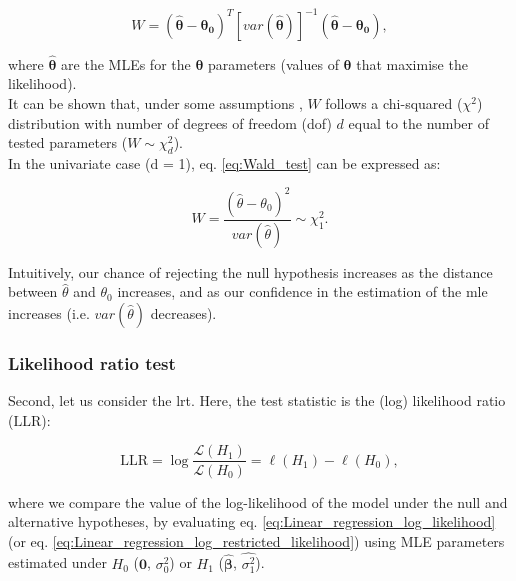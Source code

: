 \begin{equation}\label{eq:Wald_test}
W = (\hat{\boldsymbol{\theta}}-\boldsymbol{\theta_0})^T [var(\boldsymbol{\hat{\theta}})]^{-1}(\hat{\boldsymbol{\theta}}-\boldsymbol{\theta_0}), 
\end{equation}

where $\hat{\boldsymbol{\theta}}$ are the MLEs for the $\boldsymbol{\theta}$ parameters (values of $\boldsymbol{\theta}$ that maximise the likelihood).\\

It can be shown that, under some assumptions \cite{wald1943tests}, $W$ follows a chi-squared ($\chi^2$) distribution with number of degrees of freedom (dof) $d$ equal to the number of tested parameters ($W \sim \chi^2_d $).\\

In the univariate case (d = 1), eq. \eqref{eq:Wald_test} can be expressed as:

\begin{equation}\label{eq:Wald_test_univariate}
    W = \frac{(\hat{\theta}-\theta_0)^2}{var(\hat{\theta})} \sim \chi^2_1.
\end{equation}

Intuitively, our chance of rejecting the null hypothesis increases as the distance between $\hat{\theta}$ and $\theta_0$ increases, and as our confidence in the estimation of the \gls{mle} increases (i.e. $var(\hat{\theta})$ decreases).

\newpage

\subsubsection{Likelihood ratio test}

Second, let us consider the \gls{lrt}.
Here, the test statistic is the (log) likelihood ratio ($\mathrm{LLR}$):

\begin{equation}\label{eq:log_likelihood_ratio}
\mathrm{LLR} = \log \frac{\mathcal{L}(H_1)}{\mathcal{L}(H_0)} = \ell(H_1) - \ell(H_0), 
\end{equation}

where we compare the value of the log-likelihood of the model under the null and alternative hypotheses, by evaluating eq. \eqref{eq:Linear_regression_log_likelihood} (or eq. \eqref{eq:Linear_regression_log_restricted_likelihood}) using MLE parameters estimated under $H_0$ ($\mathbf{0}$, $\sigma_0^2$) or $H_1$ ($\hat{\boldsymbol{\beta}}$, $\hat{\sigma_1^2}$).  \\

